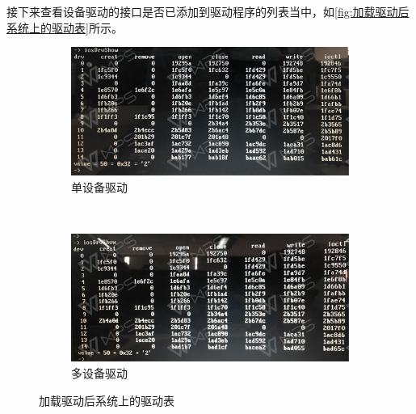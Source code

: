 \noindent 接下来查看设备驱动的接口是否已添加到驱动程序的列表当中，如\autoref{fig:加载驱动后系统上的驱动表}所示。
\begin{figure}[h]
\centering
  \begin{subfigure}[b]{0.7\textwidth}
  \includegraphics[width=\textwidth]{./graphics/iosDrvShowS.pdf}
  \caption{单设备驱动}
  \end{subfigure}
  ~
  \begin{subfigure}[b]{0.7\textwidth}
  \includegraphics[width=\textwidth]{./graphics/iosDrvShowM.pdf}
  \caption{多设备驱动}
  \end{subfigure}
\caption{加载驱动后系统上的驱动表}\label{fig:加载驱动后系统上的驱动表}
\end{figure}


